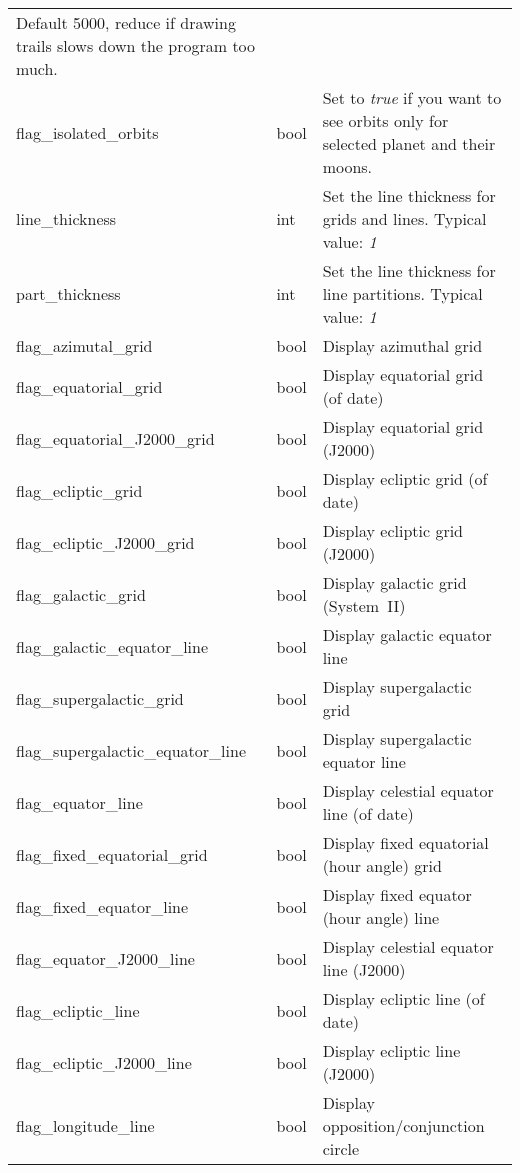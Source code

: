 \begin{longtable}{l|l|p{77mm}}
                                       Default 5000, reduce if drawing trails slows down the program too much.\\
flag\_isolated\_orbits        & bool & Set to \emph{true} if you want to see orbits only for selected planet and their moons.\\\midrule
line\_thickness               & int  & Set the line thickness for grids and lines. Typical value: \emph{1}\\%
part\_thickness               & int  & Set the line thickness for line partitions. Typical value: \emph{1}\\\midrule
flag\_azimutal\_grid          & bool & Display azimuthal grid \\%
flag\_equatorial\_grid        & bool & Display equatorial grid (of date) \\%
flag\_equatorial\_J2000\_grid & bool & Display equatorial grid (J2000) \\%
flag\_ecliptic\_grid          & bool & Display ecliptic grid (of date) \\%
flag\_ecliptic\_J2000\_grid   & bool & Display ecliptic grid (J2000) \\%
flag\_galactic\_grid          & bool & Display galactic grid (System~II)\\%
flag\_galactic\_equator\_line & bool & Display galactic equator line \\%
flag\_supergalactic\_grid          & bool & Display supergalactic grid\\%
flag\_supergalactic\_equator\_line & bool & Display supergalactic equator line \\%
flag\_equator\_line           & bool & Display celestial equator line (of date) \\%
flag\_fixed\_equatorial\_grid & bool & Display fixed equatorial (hour angle) grid \\%
flag\_fixed\_equator\_line    & bool & Display fixed equator (hour angle) line\\%
flag\_equator\_J2000\_line    & bool & Display celestial equator line (J2000) \\%
flag\_ecliptic\_line          & bool & Display ecliptic line (of date) \\%
flag\_ecliptic\_J2000\_line   & bool & Display ecliptic line (J2000) \\%
flag\_longitude\_line         & bool & Display opposition/conjunction circle \\%

\end{longtable}
